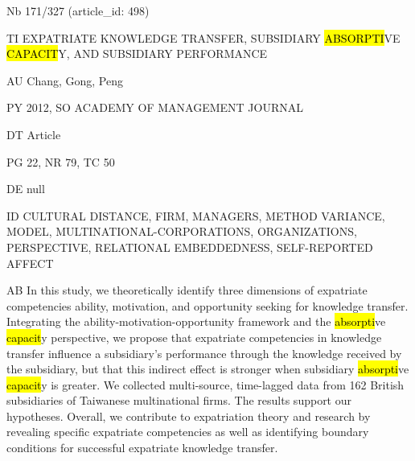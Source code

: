 \documentclass[a4paper]{article}
\begin{document}
\vspace*{-2cm}
Nb \tabto{0cm}171/327 (article\_id: 498)\par
TI \tabto{0cm}EXPATRIATE KNOWLEDGE TRANSFER, SUBSIDIARY \hl{ABSORPTI}VE \hl{CAPACIT}Y, AND SUBSIDIARY PERFORMANCE\par
AU \tabto{0cm}Chang, Gong, Peng\par
PY \tabto{0cm}2012, SO ACADEMY OF MANAGEMENT JOURNAL\par
DT \tabto{0cm}Article\par
PG \tabto{0cm}22, NR 79, TC 50\par
DE \tabto{0cm}null\par
ID \tabto{0cm}CULTURAL DISTANCE, FIRM, MANAGERS, METHOD VARIANCE, MODEL, MULTINATIONAL-CORPORATIONS, ORGANIZATIONS, PERSPECTIVE, RELATIONAL EMBEDDEDNESS, SELF-REPORTED AFFECT\par
AB \tabto{0cm}In this study, we theoretically identify three dimensions of expatriate competencies ability, motivation, and opportunity seeking for knowledge transfer. Integrating the ability-motivation-opportunity framework and the \hl{absorpti}ve \hl{capacit}y perspective, we propose that expatriate competencies in knowledge transfer influence a subsidiary's performance through the knowledge received by the subsidiary, but that this indirect effect is stronger when subsidiary \hl{absorpti}ve \hl{capacit}y is greater. We collected multi-source, time-lagged data from 162 British subsidiaries of Taiwanese multinational firms. The results support our hypotheses. Overall, we contribute to expatriation theory and research by revealing specific expatriate competencies as well as identifying boundary conditions for successful expatriate knowledge transfer.\par
\clearpage
\end{document}

